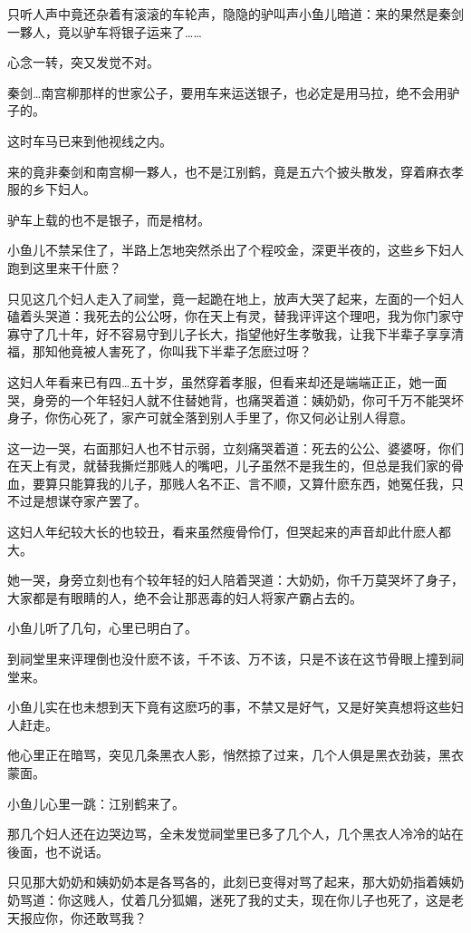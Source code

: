 \documentclass[12pt,oneside]{book}
\begin{document}
只听人声中竟还杂着有滚滚的车轮声，隐隐的驴叫声小鱼儿暗道：来的果然是秦剑一夥人，竟以驴车将银子运来了\ldots\ldots{}

心念一转，突又发觉不对。

秦剑\ldots 南宫柳那样的世家公子，要用车来运送银子，也必定是用马拉，绝不会用驴子的。

这时车马已来到他视线之内。

来的竟非秦剑和南宫柳一夥人，也不是江别鹤，竟是五六个披头散发，穿着麻衣孝服的乡下妇人。

驴车上载的也不是银子，而是棺材。

小鱼儿不禁呆住了，半路上怎地突然杀出了个程咬金，深更半夜的，这些乡下妇人跑到这里来干什麽？

只见这几个妇人走入了祠堂，竟一起跪在地上，放声大哭了起来，左面的一个妇人磕着头哭道：我死去的公公呀，你在天上有灵，替我评评这个理吧，我为你门家守寡守了几十年，好不容易守到儿子长大，指望他好生孝敬我，让我下半辈子享享清福，那知他竟被人害死了，你叫我下半辈子怎麽过呀？

这妇人年看来已有四\ldots 五十岁，虽然穿着孝服，但看来却还是端端正正，她一面哭，身旁的一个年轻妇人就不住替她背，也痛哭着道：姨奶奶，你可千万不能哭坏身子，你伤心死了，家产可就全落到别人手里了，你又何必让别人得意。

这一边一哭，右面那妇人也不甘示弱，立刻痛哭着道：死去的公公、婆婆呀，你们在天上有灵，就替我撕烂那贱人的嘴吧，儿子虽然不是我生的，但总是我们家的骨血，要算只能算我的儿子，那贱人名不正、言不顺，又算什麽东西，她冤任我，只不过是想谋夺家产罢了。

这妇人年纪较大长的也较丑，看来虽然瘦骨伶仃，但哭起来的声音却此什麽人都大。

她一哭，身旁立刻也有个较年轻的妇人陪着哭道：大奶奶，你千万莫哭坏了身子，大家都是有眼睛的人，绝不会让那恶毒的妇人将家产霸占去的。

小鱼儿听了几句，心里已明白了。

到祠堂里来评理倒也没什麽不该，千不该、万不该，只是不该在这节骨眼上撞到祠堂来。

小鱼儿实在也未想到天下竟有这麽巧的事，不禁又是好气，又是好笑真想将这些妇人赶走。

他心里正在暗骂，突见几条黑衣人影，悄然掠了过来，几个人俱是黑衣劲装，黑衣蒙面。

小鱼儿心里一跳：江别鹤来了。

那几个妇人还在边哭边骂，全未发觉祠堂里已多了几个人，几个黑衣人冷冷的站在後面，也不说话。

只见那大奶奶和姨奶奶本是各骂各的，此刻已变得对骂了起来，那大奶奶指着姨奶奶骂道：你这贱人，仗着几分狐媚，迷死了我的丈夫，现在你儿子也死了，这是老天报应你，你还敢骂我？
\end{document}

